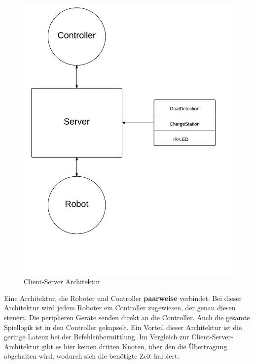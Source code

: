 \begin{figure}
	\includegraphics[height=0.5\textheight]{images/client-server_architektur.pdf}
	\caption{Client-Server Architektur}
	\label{fig:client-server_architektur}
\end{figure}


Eine Architektur, die Roboter und Controller \textbf{paarweise} verbindet. Bei dieser Architektur wird jedem Roboter ein Controller zugewiesen, der genau diesen steuert. Die peripheren Geräte senden direkt an die Controller. Auch die gesamte Spiellogik ist in den Controller gekapselt. Ein Vorteil dieser Architektur ist die geringe Latenz bei der Befehlsübermittlung. Im Vergleich zur Client-Server-Architektur gibt es hier keinen dritten Knoten, über den die Übertragung abgehalten wird, wodurch sich die benötigte Zeit halbiert.

